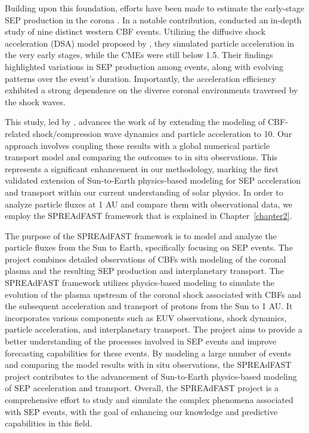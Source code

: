 Building upon this foundation, efforts have been made to estimate the early-stage SEP production in the corona \citep{kozarev_2013, schwadron_2015}. In a notable contribution, \citet{kozarev_2019} conducted an in-depth study of nine distinct western CBF events. Utilizing the diffusive shock acceleration (DSA) model proposed by \citet{kozarev_2016}, they simulated particle acceleration in the very early stages, while the CMEs were still below 1.5\rsun. Their findings highlighted variations in SEP production among events, along with evolving patterns over the event's duration. Importantly, the acceleration efficiency exhibited a strong dependence on the diverse coronal environments traversed by the shock waves.

This study, led by \citet{kozarev_2022}, advances the work of \citet{kozarev_2019} by extending the modeling of CBF-related shock/compression wave dynamics and particle acceleration to 10\rsun. Our approach involves coupling these results with a global numerical particle transport model and comparing the outcomes to in situ observations. This represents a significant enhancement in our methodology, marking the first validated extension of Sun-to-Earth physics-based modeling for SEP acceleration and transport within our current understanding of solar physics.
In order to analyze particle fluxes at 1 AU and compare them with observational data, we employ the SPREAdFAST framework that is explained in Chapter~\ref{chapter2}.

The purpose of the SPREAdFAST framework is to model and analyze the particle fluxes from the Sun to Earth, specifically focusing on SEP events. The project combines detailed observations of CBFs with modeling of the coronal plasma and the resulting SEP production and interplanetary transport. The SPREAdFAST framework utilizes physics-based modeling to simulate the evolution of the plasma upstream of the coronal shock associated with CBFs and the subsequent acceleration and transport of protons from the Sun to 1 AU. It incorporates various components such as EUV observations, shock dynamics, particle acceleration, and interplanetary transport. The project aims to provide a better understanding of the processes involved in SEP events and improve forecasting capabilities for these events. By modeling a large number of events and comparing the model results with in situ observations, the SPREAdFAST project contributes to the advancement of Sun-to-Earth physics-based modeling of SEP acceleration and transport. Overall, the SPREAdFAST project is a comprehensive effort to study and simulate the complex phenomena associated with SEP events, with the goal of enhancing our knowledge and predictive capabilities in this field.

